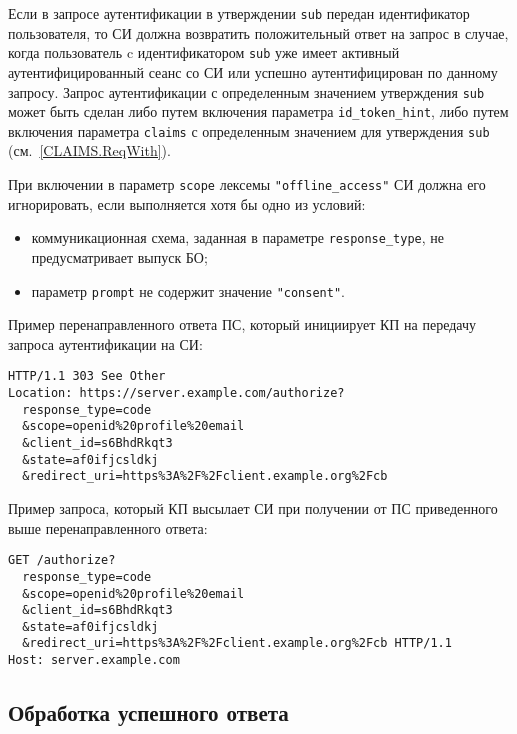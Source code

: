 Если в запросе аутентификации в утверждении \lstinline{sub} передан 
идентификатор пользователя, то СИ должна возвратить положительный ответ на 
запрос в случае, когда пользователь c идентификатором \lstinline{sub} 
уже имеет активный аутентифицированный сеанс со СИ или успешно аутентифицирован 
по данному запросу.
%
Запрос аутентификации с определенным значением утверждения \lstinline{sub} может
быть сделан либо путем включения параметра \lstinline{id_token_hint}, либо путем
включения параметра \lstinline{claims} с определенным значением для утверждения
\lstinline{sub} (см.~\ref{CLAIMS.ReqWith}).


При включении в параметр \lstinline{scope} лексемы \lstinline{"offline_access"}
СИ должна его игнорировать, если выполняется хотя бы одно из условий:
\begin{itemize}
\item
коммуникационная схема, заданная в параметре \lstinline{response_type}, 
не предусматривает выпуск БО;
\item
параметр \lstinline{prompt} не содержит значение \lstinline{"consent"}.
\end{itemize}

Пример перенаправленного ответа ПС, который инициирует КП на передачу запроса 
аутентификации на СИ: 
%
\begin{lstlisting}
HTTP/1.1 303 See Other 
Location: https://server.example.com/authorize?
  response_type=code
  &scope=openid%20profile%20email
  &client_id=s6BhdRkqt3
  &state=af0ifjcsldkj
  &redirect_uri=https%3A%2F%2Fclient.example.org%2Fcb
\end{lstlisting}

Пример запроса, который КП высылает СИ при получении от ПС приведенного 
выше перенаправленного ответа:
%
\begin{lstlisting}
GET /authorize?
  response_type=code
  &scope=openid%20profile%20email
  &client_id=s6BhdRkqt3
  &state=af0ifjcsldkj
  &redirect_uri=https%3A%2F%2Fclient.example.org%2Fcb HTTP/1.1
Host: server.example.com
\end{lstlisting}

\subsection{Обработка успешного ответа}\label{REQRESP.Auth.Resp}

